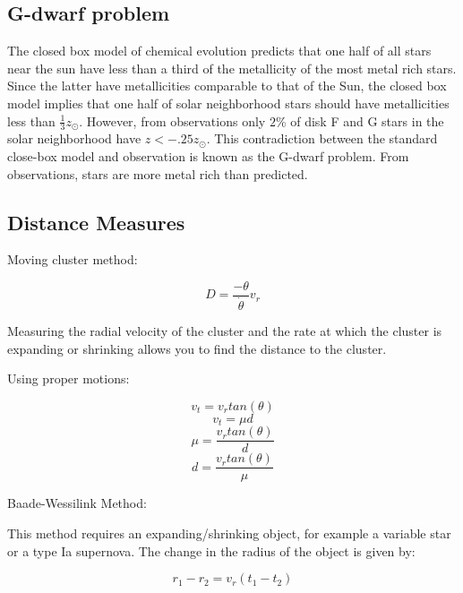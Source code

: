 \subsection{G-dwarf problem}

The closed box model of chemical evolution predicts that one half of all stars near the sun have less than a third of the metallicity of the most metal rich stars.  Since the latter have metallicities comparable to that of the Sun, the closed box model implies that one half of solar neighborhood stars should have metallicities less than $\frac{1}{3}z_\odot$.  However, from observations only $2$\% of disk F and G stars in the solar neighborhood have $z < -.25 z_\odot$.  This contradiction between the standard close-box model and observation is known as the G-dwarf problem.  From observations, stars are more metal rich than predicted.

\subsection{Distance Measures}

Moving cluster method:

\begin{equation}
D = \frac{-\theta}{\dot \theta}v_r
\end{equation}

Measuring the radial velocity of the cluster and the rate at which the cluster is expanding or shrinking allows you to find the distance to the cluster.

Using proper motions:

\begin{equation}
v_t = v_rtan(\theta)
\end{equation}
\begin{equation}
v_t = \mu d
\end{equation}
\begin{equation}
\mu = \frac{v_rtan(\theta)}{d}
\end{equation}
\begin{equation}
d = \frac{v_rtan(\theta)}{\mu}
\end{equation}

Baade-Wessilink Method:

This method requires an expanding/shrinking object, for example a variable star or a type Ia supernova.  The change in the radius of the object is given by:

\begin{equation}
r_1 - r_2 = v_r(t_1 - t_2)
\end{equation}

